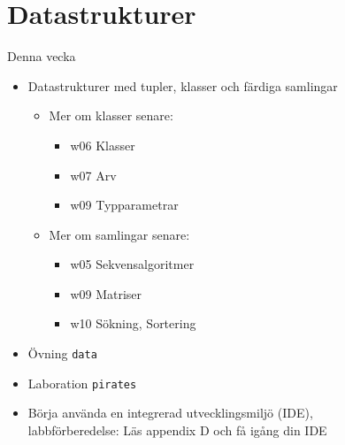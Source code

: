 \documentclass{lecturenotes}
\renewcommand{\vecka}{4}
\newcommand{\veckotema}{Datastrukturer}
\begin{document}
\frame{\titlepage}
\setnextsection{\vecka}
\section[Vecka \vecka: \veckotema]{\veckotema}
\frame{\tableofcontents}

\ifkompendium\else
\begin{Slide}{Denna vecka}
\begin{itemize}
\item Datastrukturer med tupler, klasser och färdiga samlingar
\begin{itemize}
\item Mer om klasser senare: 
\begin{itemize}
\item w06 Klasser \item w07 Arv \item w09 Typparametrar
\end{itemize}

\item Mer om samlingar senare: 
\begin{itemize}
\item w05 Sekvensalgoritmer \item w09 Matriser \item w10 Sökning, Sortering
\end{itemize}
\end{itemize}

\item Övning \texttt{data}

\item Laboration \texttt{pirates}

\item Börja använda en integrerad utvecklingsmiljö (IDE),\\labbförberedelse: Läs appendix D och få igång din IDE

\end{itemize}
\end{Slide}
\fi






\end{document}
